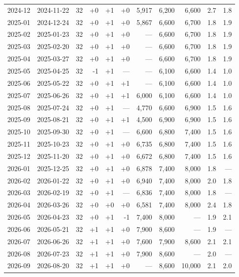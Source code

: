 \documentclass[xelatex,ja=standard,jafont=hiragino-pron,a4paper,10pt]{bxjsreport}
\begin{document}
{\begin{longtable}{llrrrrrrrrr}
2024-12 & 2024-11-22 & 32 & +0 & +1 & +0 & 5,917 & 6,200 & 6,600 & 2.7 & 1.8 \\
2025-01 & 2024-12-24 & 32 & +0 & +1 & +0 & 5,867 & 6,600 & 6,700 & 1.8 & 1.9 \\
2025-02 & 2025-01-23 & 32 & +0 & +1 & +0 & --- & 6,600 & 6,700 & 1.8 & 1.9 \\
2025-03 & 2025-02-20 & 32 & +0 & +1 & +0 & --- & 6,600 & 6,700 & 1.8 & 1.9 \\
2025-04 & 2025-03-27 & 32 & +0 & +1 & +0 & --- & 6,600 & 6,700 & 1.8 & 1.9 \\
2025-05 & 2025-04-25 & 32 & -1 & +1 & --- & --- & 6,100 & 6,600 & 1.4 & 1.0 \\
2025-06 & 2025-05-22 & 32 & +0 & +1 & +1 & --- & 6,100 & 6,600 & 1.4 & 1.0 \\
2025-07 & 2025-06-26 & 32 & +0 & +1 & +1 & 6,000 & 6,100 & 6,600 & 1.4 & 1.0 \\
2025-08 & 2025-07-24 & 32 & +0 & +1 & --- & 4,770 & 6,600 & 6,900 & 1.5 & 1.6 \\
2025-09 & 2025-08-21 & 32 & +0 & +1 & +1 & 4,500 & 6,900 & 6,900 & 1.5 & 1.6 \\
2025-10 & 2025-09-30 & 32 & +0 & +1 & --- & 6,600 & 6,800 & 7,400 & 1.5 & 1.6 \\
2025-11 & 2025-10-23 & 32 & +0 & +1 & +0 & 6,735 & 6,800 & 7,400 & 1.5 & 1.6 \\
2025-12 & 2025-11-20 & 32 & +0 & +1 & +0 & 6,672 & 6,800 & 7,400 & 1.5 & 1.6 \\
2026-01 & 2025-12-25 & 32 & +0 & +1 & +0 & 6,878 & 7,400 & 8,000 & 1.8 & --- \\
2026-02 & 2026-01-22 & 32 & +0 & +1 & +0 & 6,940 & 7,400 & 8,000 & 2.0 & 1.8 \\
2026-03 & 2026-02-19 & 32 & +0 & +1 & --- & 6,836 & 7,400 & 8,000 & 1.8 & --- \\
2026-04 & 2026-03-26 & 32 & +0 & +0 & +0 & 6,581 & 7,400 & 8,000 & 2.4 & 1.8 \\
2026-05 & 2026-04-23 & 32 & +0 & +1 & -1 & 7,400 & 8,000 & --- & 1.9 & 2.1 \\
2026-06 & 2026-05-21 & 32 & +1 & +1 & +0 & 7,900 & 8,600 & --- & 1.9 & --- \\
2026-07 & 2026-06-26 & 32 & +1 & +1 & +0 & 7,600 & 7,900 & 8,600 & 2.1 & 2.1 \\
2026-08 & 2026-07-23 & 32 & +1 & +1 & +0 & 7,900 & 8,600 & --- & 2.0 & --- \\
2026-09 & 2026-08-20 & 32 & +1 & +1 & +0 & --- & 8,600 & 10,000 & 2.1 & 2.0 \\
\end{longtable}
}
\end{document}
